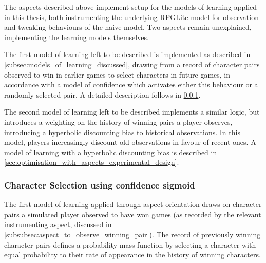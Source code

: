 The aspects described above implement setup for the models of learning applied
in this thesis, both instrumenting the underlying RPGLite model for observation
and tweaking behaviours of the naive model. Two aspects remain unexplained,
implementing the learning models themselves.

The first model of learning left to be described is implemented as described in
\cref{subsec:models_of_learning_discussed}, drawing from a record of character
pairs observed to win in earlier games to select characters in future games, in
accordance with a model of confidence which activates either this behaviour or a
randomly selected pair. A detailed description follows in
\cref{subsubsec:learning_by_picking_from_distribution_of_wins_with_confidence}.

The second model of learning left to be described implements a similar logic,
but introduces a weighting on the history of winning pairs a player observes,
introducing a hyperbolic discounting bias to historical observations. In this
model, players increasingly discount old observations in favour of recent ones.
A model of learning with a hyperbolic discounting bias is described in
\cref{sec:optimisation_with_aspects_experimental_design}.


\subsubsection{Character Selection using confidence sigmoid}\label{subsubsec:learning_by_picking_from_distribution_of_wins_with_confidence}

The first model of learning applied through aspect orientation draws on
character pairs a simulated player observed to have won games (as recorded by
the relevant instrumenting aspect, discussed in
\cref{subsubsec:aspect_to_observe_winning_pair}). The record of previously
winning character pairs defines a probability mass function by selecting a
character with equal probability to their rate of appearance in the history of
winning characters.

